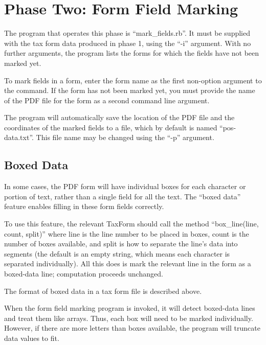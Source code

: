 \section{Phase Two: Form Field Marking}

The program that operates this phase is ``mark\_fields.rb''. It must be supplied
with the tax form data produced in phase 1, using the ``-i'' argument. With no
further arguments, the program lists the forms for which the fields have not
been marked yet.

To mark fields in a form, enter the form name as the first non-option argument
to the command. If the form has not been marked yet, you must provide the name
of the PDF file for the form as a second command line argument.

The program will automatically save the location of the PDF file and the
coordinates of the marked fields to a file, which by default is named
``pos-data.txt''. This file name may be changed using the ``-p'' argument.




\subsection{Boxed Data}

In some cases, the PDF form will have individual boxes for each character or
portion of text, rather than a single field for all the text. The ``boxed data''
feature enables filling in these form fields correctly.

To use this feature, the relevant TaxForm should call the method
``box\_line(line, count, split)'' where line is the line number to be placed
in boxes, count is the number of boxes available, and split is how to separate
the line's data into segments (the default is an empty string, which means each
character is separated individually). All this does is mark the relevant line in
the form as a boxed-data line; computation proceeds unchanged.

The format of boxed data in a tax form file is described above.

When the form field marking program is invoked, it will detect boxed-data lines
and treat them like arrays. Thus, each box will need to be marked individually.
However, if there are more letters than boxes available, the program will
truncate data values to fit.





